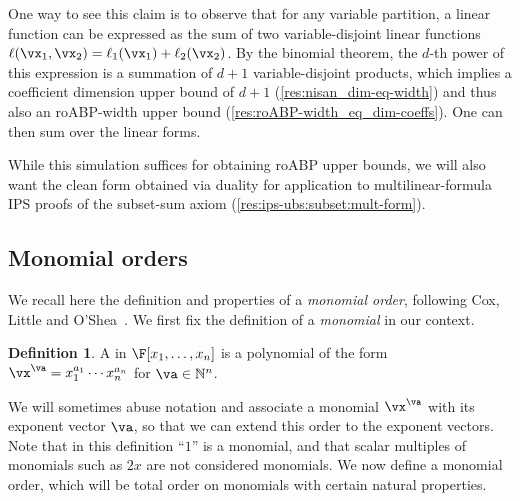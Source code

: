 \documentclass[11pt]{article}
\numberwithin{equation}{section}
\theoremstyle{definition}
\newtheorem{definition}[theorem]{Definition}
\theoremstyle{plain}
\newcommand{\N}{\mathbb N}
\begin{document}
One way to see this claim is to observe that for any variable partition, a linear function can be expressed as the sum of two variable-disjoint linear functions $\ell(\vx_1,\vx_2)=\ell_1(\vx_1)+\ell_2(\vx_2)$.  By the binomial theorem, the $d$-th power of this expression is a summation of $d+1$ variable-disjoint products, which implies a coefficient dimension upper bound of $d+1$ (\autoref{res:nisan_dim-eq-width}) and thus also an roABP-width upper bound (\autoref{res:roABP-width_eq_dim-coeffs}).  One can then sum over the linear forms.

While this simulation suffices for obtaining roABP upper bounds, we will also want the clean form obtained via duality for application to multilinear-formula IPS proofs of the subset-sum axiom (\autoref{res:ips-ubs:subset:mult-form}).

\subsection{Monomial orders}\label{sec:mon-ord}

We recall here the definition and properties of a \emph{monomial order}, following Cox, Little and O'Shea~\cite{CoxLittleOShea07}.  We first fix the definition of a \emph{monomial} in our context.

\begin{definition}
        A  in $\F[x_1,\ldots,x_n]$ is a polynomial of the form $\vx^\va=x_1^{a_1}\cdots x_n^{a_n}$ for $\va\in\N^n$.
\end{definition}

We will sometimes abuse notation and associate a monomial $\vx^\va$ with its exponent vector $\va$, so that we can extend this order to the exponent vectors. Note that in this definition ``$1$'' is a monomial, and that scalar multiples of monomials such as $2x$ are not considered monomials. We now define a monomial order, which will be total order on monomials with certain natural properties.
\end{document}
